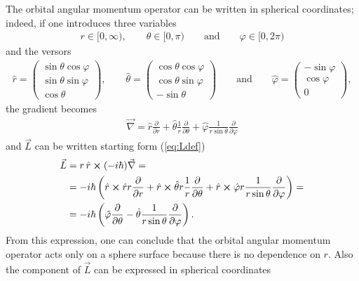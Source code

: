 The orbital angular momentum operator can be written in spherical coordinates; indeed, if one introduces three variables 
\begin{align*}
    r \in [0,\infty), \qquad \theta \in [0,\pi) \qquad \text{and} \qquad \varphi \in [0, 2\pi)
\end{align*}
and the versors
\begin{align*}
    \hat{r} = \begin{pmatrix} \sin{\theta} \cos{\varphi} \\ \sin{\theta} \sin{\varphi} \\ \cos{\theta} \end{pmatrix}, \qquad \hat{\theta} = \begin{pmatrix} \cos{\theta} \cos{\varphi} \\ \cos{\theta} \sin{\varphi} \\ -\sin{\theta} \end{pmatrix} \qquad \text{and} \qquad \hat{\varphi} = \begin{pmatrix} -\sin{\varphi} \\ \cos{\varphi} \\ 0  \end{pmatrix},
\end{align*}
the gradient becomes 
\begin{align}
   \vec{\nabla} = \hat{r} \frac{\partial}{\partial r} + \hat{\theta} \frac{1}{r} \frac{\partial}{\partial \theta} + \hat{\varphi} \frac{1}{r \sin{\theta}} \frac{\partial}{\partial\varphi}
\end{align}
and $\vec{L}$ can be written starting form (\ref{eq:Ldef})
\begin{align*}
    \vec{L} &= r \, \hat{r} \cross (-i \hbar) \vec{\nabla} = \\
    &= -i\hbar \left( \hat{r} \cross \hat{r} r \frac{\partial}{\partial r} + \hat{r} \cross \hat{\theta} r  \frac{1}{r} \frac{\partial}{\partial \theta} +  \hat{r} \cross \hat{\varphi} r \frac{1}{r \sin{\theta}} \frac{\partial}{\partial\varphi} \right) = \\
    &= -i \hbar \left( \hat{\varphi}  \frac{\partial}{\partial \theta} -  \hat{\theta} \frac{1}{r \sin{\theta}} \frac{\partial}{\partial\varphi} \right). 
\end{align*}
From this expression, one can conclude that the orbital angular momentum operator acts only on a sphere surface because there is no dependence on $r$. 
Also the component of $\vec{L}$ can be expressed in spherical coordinates
